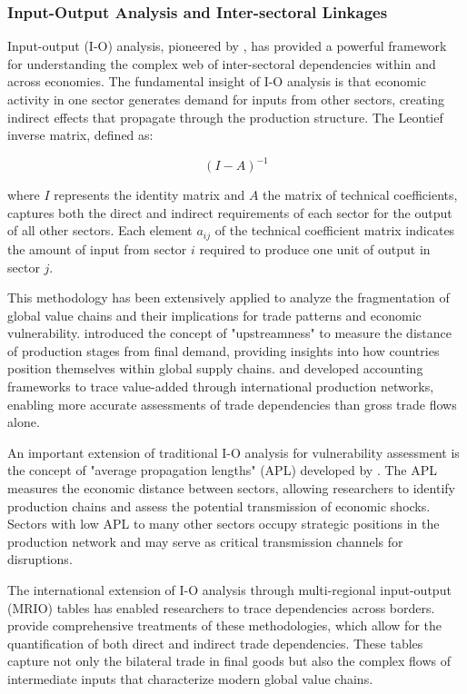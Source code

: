 \documentclass[final,1p,times,authoryear]{elsarticle}
\begin{document}
\subsubsection{Input-Output Analysis and Inter-sectoral Linkages}

Input-output (I-O) analysis, pioneered by \cite{Leontief1951}, has provided a powerful framework for understanding the complex web of inter-sectoral dependencies within and across economies. The fundamental insight of I-O analysis is that economic activity in one sector generates demand for inputs from other sectors, creating indirect effects that propagate through the production structure. The Leontief inverse matrix, defined as:

\begin{equation}
(I - A)^{-1}
\end{equation}

where $I$ represents the identity matrix and $A$ the matrix of technical coefficients, captures both the direct and indirect requirements of each sector for the output of all other sectors. Each element $a_{ij}$ of the technical coefficient matrix indicates the amount of input from sector $i$ required to produce one unit of output in sector $j$.

This methodology has been extensively applied to analyze the fragmentation of global value chains and their implications for trade patterns and economic vulnerability. \cite{Antras2012} introduced the concept of "upstreamness" to measure the distance of production stages from final demand, providing insights into how countries position themselves within global supply chains. \cite{Johnson2012} and \cite{Koopman2014} developed accounting frameworks to trace value-added through international production networks, enabling more accurate assessments of trade dependencies than gross trade flows alone.

An important extension of traditional I-O analysis for vulnerability assessment is the concept of "average propagation lengths" (APL) developed by \cite{Dietzenbacher2005}. The APL measures the economic distance between sectors, allowing researchers to identify production chains and assess the potential transmission of economic shocks. Sectors with low APL to many other sectors occupy strategic positions in the production network and may serve as critical transmission channels for disruptions.

The international extension of I-O analysis through multi-regional input-output (MRIO) tables has enabled researchers to trace dependencies across borders. \cite{MillerBlair2009} provide comprehensive treatments of these methodologies, which allow for the quantification of both direct and indirect trade dependencies. These tables capture not only the bilateral trade in final goods but also the complex flows of intermediate inputs that characterize modern global value chains.
\end{document}
